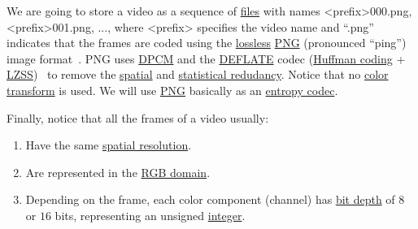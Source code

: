 We are going to store a video as a sequence of
\href{https://en.wikipedia.org/wiki/Computer_file}{files} with names
<prefix>000.png, <prefix>001.png, ..., where <prefix> specifies the
video name and ``.png'' indicates that the frames are coded using the
\href{https://en.wikipedia.org/wiki/Lossless_compression}{lossless}
\href{https://en.wikipedia.org/wiki/Portable_Network_Graphics}{PNG}
(pronounced ``ping'') image
format~\cite{roelofs1999png,world2003portable}. PNG uses
\href{https://en.wikipedia.org/wiki/Differential_pulse-code_modulation}{DPCM}
and the \href{https://en.wikipedia.org/wiki/DEFLATE}{DEFLATE} codec
(\href{https://en.wikipedia.org/wiki/Huffman_coding}{Huffman coding} +
\href{https://en.wikipedia.org/wiki/Lempel-Ziv-Storer-Szymanski}{LZSS})~\cite{nelson96datacompression}
to remove the
\href{https://en.wikipedia.org/wiki/Image_compression}{spatial} and
\href{https://en.wikipedia.org/wiki/Data_compression}{statistical
  redudancy}. Notice that no
\href{https://en.wikipedia.org/wiki/YUV}{color transform} is used. We will use \href{https://vicente-gonzalez-ruiz.github.io/PNG/}{PNG}
basically as an
\href{https://en.wikipedia.org/wiki/Entropy_encoding}{entropy codec}.


Finally, notice that all the frames of a video usually:
\begin{enumerate}
\item Have the same
  \href{https://en.wikipedia.org/wiki/Image_resolution}{spatial
    resolution}.
\item Are represented in the
  \href{https://en.wikipedia.org/wiki/RGB_color_model}{RGB domain}.
\item Depending on the frame, each color component (channel) has
  \href{https://en.wikipedia.org/wiki/Glossary_of_computer_graphics#bit_depth}{bit
    depth} of $8$ or $16$ bits, representing an unsigned
  \href{https://en.wikipedia.org/wiki/Integer_(computer_science)}{integer}.
\end{enumerate}
  
